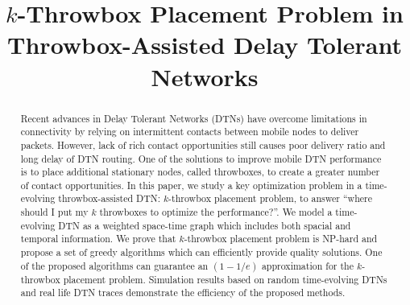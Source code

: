 \documentclass[10pt,conference,compsocconf,letterpaper]{IEEEtran}
\begin{document}
\title{$k$-Throwbox Placement Problem in Throwbox-Assisted Delay Tolerant Networks}

\author{


}

\maketitle

\thispagestyle{empty}

\begin{abstract}
Recent advances in Delay Tolerant Networks (DTNs) have overcome limitations in connectivity
by relying on intermittent contacts between mobile nodes to deliver packets. However, lack of
rich contact opportunities still causes poor delivery ratio and long delay of DTN routing. One
of the solutions to improve mobile DTN performance is to place additional stationary nodes, called
throwboxes, to create a greater number of contact opportunities. In this paper, we study  a key
optimization problem in a time-evolving throwbox-assisted DTN: $k$-throwbox placement problem,
to answer  ``where should I put my $k$ throwboxes to optimize the performance?''.  We model a
time-evolving DTN as a weighted space-time graph which includes both spacial and temporal
information. We prove that $k$-throwbox placement problem is NP-hard and propose a set of
greedy algorithms which can efficiently provide quality solutions. One of the proposed algorithms
can guarantee an $(1-1/e)$ approximation for the $k$-throwbox placement problem. Simulation results
based on random time-evolving DTNs and real life DTN traces demonstrate the efficiency of the proposed methods.
\end{abstract}
\end{document}
